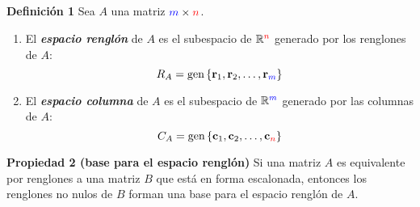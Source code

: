 
\subsection{}

\begin{frame}%

\begin{defi}{\textbf{Definición 1}}
	Sea $A$ una matriz ${\color{blue}m}\times {\color{red}n}$.
	\begin{enumerate}
		\item[\labelname{$a$}] El \textbf{\textit{espacio renglón}} de $A$ es el subespacio de $\mathbb{R}^{\color{red}n}$ generado por los renglones de $A$:
		\[
		R_A = \text{gen}\, \{ \mathbf{r}_1, \mathbf{r}_2, \hdots,\mathbf{r}_{\color{blue}m} \}
		\]
		\item[\labelname{$b$}] El \textbf{\textit{espacio columna}} de $A$ es el subespacio de $\mathbb{R}^{\color{blue}m}$ generado por las columnas de $A$:
		\[
		C_A = \text{gen}\, \{ \mathbf{c}_1, \mathbf{c}_2, \hdots,\mathbf{c}_{\color{red}n} \}
		\]
	\end{enumerate}
\end{defi}	


\begin{prop}{\textbf{Propiedad 2 (base para el espacio renglón)}}
	\justifying
	Si una matriz $A$ es equivalente por renglones a una matriz $B$ que está en forma escalonada,
	entonces los renglones no nulos de $B$ forman una base para el espacio renglón de $A$.
\end{prop}	

\end{frame}


\subsection{}

